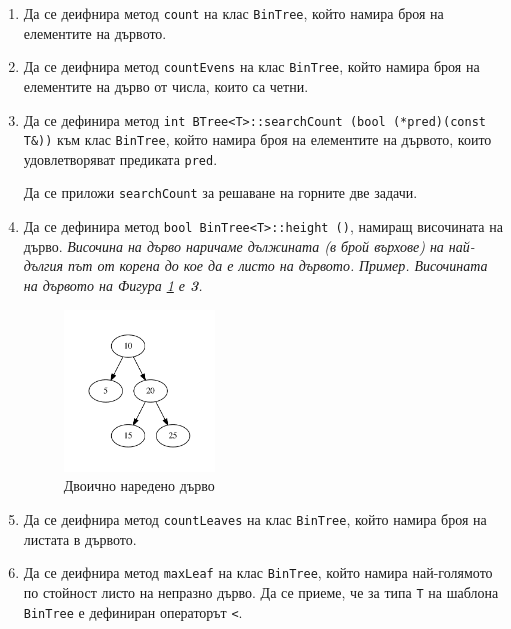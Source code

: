 \begin{enumerate}[]

	\item Да се деифнира метод \texttt{count} на клас \texttt{BinTree}, който намира броя на елементите на дървото.

	\item Да се деифнира метод \texttt{countEvens} на клас \texttt{BinTree}, който намира броя на елементите на дърво от числа, които са четни.


	\item Да се дефинира метод \texttt{int BTree<T>::searchCount (bool (*pred)(const T\&))} към клас \texttt{BinTree}, който намира броя на елементите на дървото, които удовлетворяват предиката \texttt{pred}.

	Да се приложи \texttt{searchCount} за решаване на горните две задачи.

	\item Да се дефинира метод \texttt{bool BinTree<T>::height ()}, намиращ височината на дърво. \textit{Височина на дърво наричаме дължината (в брой върхове) на най-дългия път от корена до кое да е листо на дървото.}
	\textit{Пример. Височината на дървото на Фигура \ref{fig:tree1} е \textbf{3}.}

  \begin{figure}
  \centering
	\includegraphics[width=4cm]{images/tree1}

	\caption{Двоично наредено дърво}
  \label{fig:tree1}
  \end{figure}


	\item Да се деифнира метод \texttt{countLeaves} на клас \texttt{BinTree}, който намира броя на листата в дървото.

	\item Да се деифнира метод \texttt{maxLeaf} на клас \texttt{BinTree}, който намира най-голямото по стойност листо на непразно дърво. Да се приеме, че за типа \texttt{T} на шаблона \texttt{BinTree} е дефиниран операторът \texttt{<}.


\end{enumerate}
